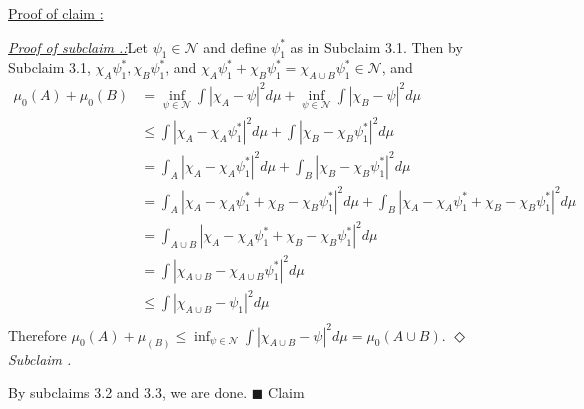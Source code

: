 \documentclass[12pt]{article}
\newcounter{ProofCounter}
\newcounter{ClaimCounter}[ProofCounter]
\newcounter{SubClaimCounter}[ClaimCounter]
\newenvironment{claimproof}[1]{\par\noindent\underline{Proof of claim \theClaimCounter:}\space#1}{\hfill $\blacksquare$ Claim \theClaimCounter}
\newenvironment{subclaim}[1]{\stepcounter{SubClaimCounter}\par\noindent\emph{\underline{Subclaim \theClaimCounter.\theSubClaimCounter:}}\space#1}{}
\newenvironment{subclaimproof}[1]{\par\noindent\emph{\underline{Proof of subclaim \theClaimCounter.\theSubClaimCounter:}}\space#1}{\hfill
$\Diamond$ \emph{Subclaim \theClaimCounter.\theSubClaimCounter}}
\begin{document}
\begin{claimproof}
\begin{subclaimproof}
Let $\psi_{1} \in \mathcal{N}$ and define $\psi_{1}^{*}$ as in Subclaim 3.1. Then by Subclaim 3.1, $\chi_{A}\psi_{1}^{*}, \chi_{B}\psi_{1}^{*}$, and
$\chi_{A}\psi_{1}^{*} + \chi_{B}\psi_{1}^{*} = \chi_{A\cup B}\psi_{1}^{*} \in \mathcal{N}$, and 
\begin{align*}
\mu_0(A) + \mu_0(B) & = \inf_{\psi\in\mathcal{N}}\int|\chi_{A} - \psi|^{2}d\mu + \inf_{\psi\in\mathcal{N}}\int|\chi_{B} - \psi|^{2}d\mu \\
& \leq \int|\chi_{A} - \chi_{A}\psi_{1}^{*}|^{2}d\mu + \int|\chi_{B} - \chi_{B}\psi_{1}^{*}|^{2}d\mu \\
& = \int_{A}|\chi_{A} - \chi_{A}\psi_{1}^{*}|^{2}d\mu + \int_{B}|\chi_{B} - \chi_{B}\psi_{1}^{*}|^{2}d\mu \\
& = \int_{A}|\chi_{A} - \chi_{A}\psi_{1}^{*} + \chi_{B} - \chi_{B}\psi_{1}^{*}|^{2}d\mu + \int_{B}|\chi_{A} - \chi_{A}\psi_{1}^{*} + \chi_{B} - \chi_{B}\psi_{1}^{*}|^{2}d\mu \\
& = \int_{A\cup B}|\chi_{A} - \chi_{A}\psi_{1}^{*} + \chi_{B} - \chi_{B}\psi_{1}^{*}|^{2}d\mu \\
& = \int|\chi_{A\cup B} - \chi_{A\cup B}\psi_{1}^{*}|^{2}d\mu  \\
& \leq \int|\chi_{A\cup B} - \psi_{1}|^{2}d\mu \\
\end{align*}
Therefore $\mu_0(A) + \mu_(B) \leq \inf_{\psi\in\mathcal{N}}\int|\chi_{A\cup B} - \psi|^{2}d\mu = \mu_0(A\cup B)$.
\end{subclaimproof}

By subclaims 3.2 and 3.3, we are done.
\end{claimproof}


\newpage
\end{document}
